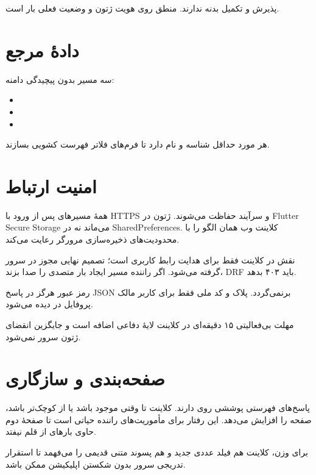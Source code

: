 پذیرش و تکمیل بدنه ندارند. منطق روی هویت ژتون و وضعیت فعلی بار است.

\section{دادهٔ مرجع}

سه مسیر  بدون پیچیدگی دامنه:

\begin{itemize}
  \item {}
  \item {}
  \item {}
\end{itemize}

هر مورد حداقل شناسه و نام دارد تا فرم‌های فلاتر فهرست کشویی بسازند.

\section{امنیت ارتباط}

همهٔ مسیرهای پس از ورود با \textenglish{HTTPS} و سرآیند  حفاظت می‌شوند. ژتون در \textenglish{Flutter Secure Storage} می‌ماند نه در \textenglish{SharedPreferences}. کلاینت وب همان الگو را با محدودیت‌های ذخیره‌سازی مرورگر رعایت می‌کند.

نقش در کلاینت فقط برای هدایت رابط کاربری است؛ تصمیم نهایی مجوز در سرور گرفته می‌شود. اگر راننده مسیر ایجاد بار متصدی را صدا بزند، \textenglish{DRF} باید ۴۰۳ بدهد.

رمز عبور هرگز در پاسخ \textenglish{JSON} برنمی‌گردد. پلاک و کد ملی فقط برای کاربر مالک پروفایل در  دیده می‌شود.

مهلت بی‌فعالیتی ۱۵ دقیقه‌ای در کلاینت لایهٔ دفاعی اضافه است و جایگزین انقضای ژتون سرور نمی‌شود.

\section{صفحه‌بندی و سازگاری}

پاسخ‌های فهرستی پوششی روی  دارند. کلاینت تا وقتی  موجود باشد یا  از  کوچک‌تر باشد، صفحه را افزایش می‌دهد. این رفتار برای مأموریت‌های راننده حیاتی است تا صفحهٔ دوم حاوی بارهای  از قلم نیفتد.

برای وزن، کلاینت هم فیلد عددی جدید و هم پسوند متنی قدیمی را می‌فهمد تا استقرار تدریجی سرور بدون شکستن اپلیکیشن ممکن باشد.
